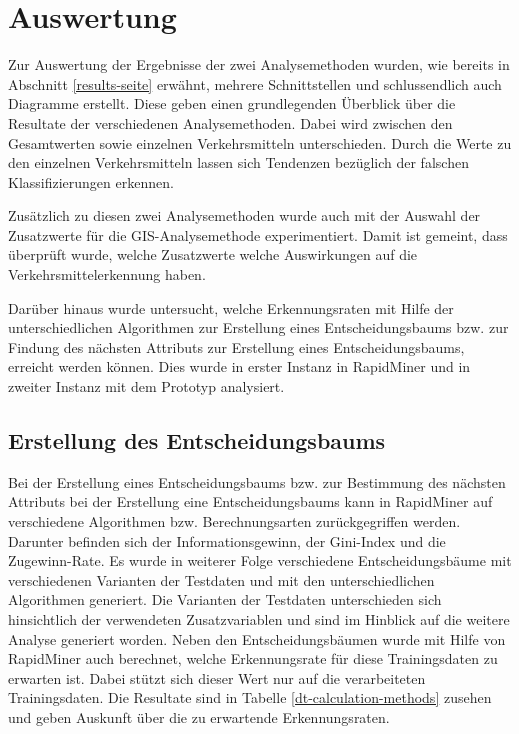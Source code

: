 \chapter{Auswertung}
\label{auswertung}

Zur Auswertung der Ergebnisse der zwei Analysemethoden wurden, wie bereits in Abschnitt \ref{results-seite}   erwähnt, mehrere Schnittstellen und schlussendlich auch Diagramme erstellt. Diese geben einen grundlegenden Überblick über die Resultate der verschiedenen Analysemethoden. Dabei wird zwischen den Gesamtwerten sowie einzelnen Verkehrsmitteln unterschieden. Durch die Werte zu den einzelnen Verkehrsmitteln lassen sich Tendenzen bezüglich der falschen Klassifizierungen erkennen. 
 
Zusätzlich zu diesen zwei Analysemethoden wurde auch mit der Auswahl der Zusatzwerte für die GIS-Analysemethode experimentiert. Damit ist gemeint, dass überprüft wurde, welche Zusatzwerte welche Auswirkungen auf die Verkehrsmittelerkennung haben. 

Darüber hinaus wurde untersucht, welche Erkennungsraten mit Hilfe der unterschiedlichen Algorithmen zur Erstellung eines Entscheidungsbaums bzw. zur Findung des nächsten Attributs zur Erstellung eines Entscheidungsbaums, erreicht werden können. Dies wurde in erster Instanz in RapidMiner und in zweiter Instanz mit dem Prototyp analysiert.
\clearpage

\section{Erstellung des Entscheidungsbaums}
\label{rapidMinerResultat}
Bei der Erstellung eines Entscheidungsbaums bzw. zur Bestimmung des nächsten Attributs bei der Erstellung eine Entscheidungsbaums kann in RapidMiner auf verschiedene Algorithmen bzw. Berechnungsarten zurückgegriffen werden. Darunter befinden sich der Informationsgewinn, der Gini-Index und die Zugewinn-Rate. Es wurde in weiterer Folge verschiedene Entscheidungsbäume mit verschiedenen Varianten der Testdaten und mit den unterschiedlichen Algorithmen generiert. Die Varianten der Testdaten unterschieden sich hinsichtlich der verwendeten Zusatzvariablen und sind im Hinblick auf die weitere Analyse generiert worden. Neben den Entscheidungsbäumen wurde mit Hilfe von RapidMiner auch berechnet, welche Erkennungsrate für diese Trainingsdaten zu erwarten ist. Dabei stützt sich dieser Wert nur auf die verarbeiteten Trainingsdaten. Die Resultate sind in Tabelle \ref{dt-calculation-methods} zusehen und geben Auskunft über die zu erwartende Erkennungsraten. 

